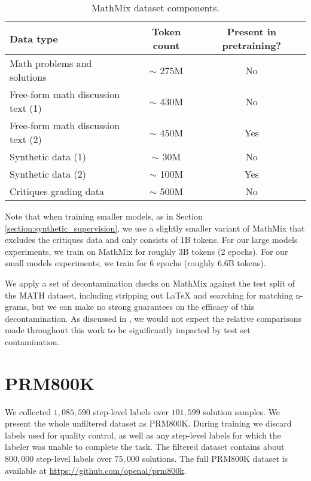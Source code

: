 \documentclass{article}
\begin{document}
\begin{table}[!h]
\centering
\begin{tabular}{l*{2}{c}} 
 \hline
  Data type & Token count & Present in pretraining? \\ 
 \hline
 Math problems and solutions & $\sim$ 275M & No \\ 
 Free-form math discussion text (1) & $\sim$ 430M & No \\
 Free-form math discussion text (2) & $\sim$ 450M & Yes \\
 Synthetic data (1) & $\sim$ 30M & No \\
 Synthetic data (2) & $\sim$ 100M & Yes \\
 Critiques grading data & $\sim$ 500M & No \\
 \hline
\end{tabular}
\caption{MathMix dataset components.}
\label{table:mathmix}
\end{table}

Note that when training smaller models, as in Section \ref{section:synthetic_supervision}, we use a slightly smaller variant of MathMix that excludes the critiques data and only consists of 1B tokens. For our large models experiments, we train on MathMix for roughly 3B tokens (2 epochs). For our small models experiments, we train for 6 epochs (roughly 6.6B tokens).

We apply a set of decontamination checks on MathMix against the test split of the MATH dataset, including stripping out LaTeX and searching for matching n-grams, but we can make no strong guarantees on the efficacy of this decontamination. As discussed in , we would not expect the relative comparisons made throughout this work to be significantly impacted by test set contamination.

\newpage

\section{PRM800K} \label{appendix:data_collection}

We collected $1,\!085,\!590$ step-level labels over $101,\!599$ solution samples. We present the whole unfiltered dataset as PRM800K. During training we discard labels used for quality control, as well as any step-level labels for which the labeler was unable to complete the task. The filtered dataset contains about $800,\!000$ step-level labels over $75,\!000$ solutions. The full PRM800K dataset is available at \href{https://github.com/openai/prm800k}{https://github.com/openai/prm800k}.
\end{document}
